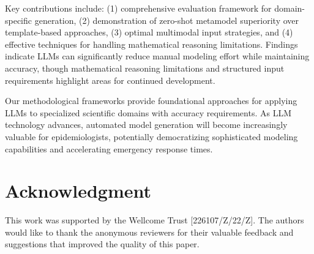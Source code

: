 \documentclass[conference]{IEEEtran}
\begin{document}
Key contributions include: (1) comprehensive evaluation framework for domain-specific generation, (2) demonstration of zero-shot metamodel superiority over template-based approaches, (3) optimal multimodal input strategies, and (4) effective techniques for handling mathematical reasoning limitations. Findings indicate LLMs can significantly reduce manual modeling effort while maintaining accuracy, though mathematical reasoning limitations and structured input requirements highlight areas for continued development.

Our methodological frameworks provide foundational approaches for applying LLMs to specialized scientific domains with accuracy requirements. As LLM technology advances, automated model generation will become increasingly valuable for epidemiologists, potentially democratizing sophisticated modeling capabilities and accelerating emergency response times.

\section*{Acknowledgment}

This work was supported by the Wellcome Trust [226107/Z/22/Z]. The authors would like to thank the anonymous reviewers for their valuable feedback and suggestions that improved the quality of this paper.




\end{document}
